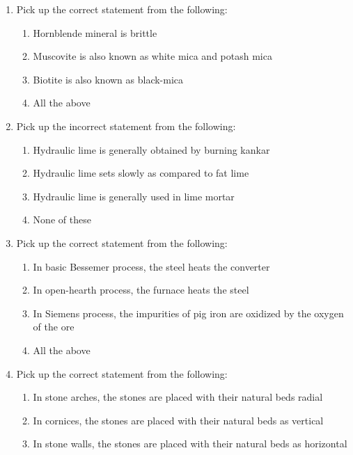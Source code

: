 \documentclass[11pt,a4paper]{article}
\begin{document}
\begin{enumerate}
\\
\item{Pick up the correct statement from the following:}
\begin{enumerate}[label=\Alph*.]
\item{Hornblende mineral is brittle}
\item{Muscovite is also known as white mica and potash mica}
\item{Biotite is also known as black-mica}
\item{All the above}
\end{enumerate}
\item{Pick up the incorrect statement from the following:}
\begin{enumerate}[label=\Alph*.]
\item{Hydraulic lime is generally obtained by burning kankar}
\item{Hydraulic lime sets slowly as compared to fat lime}
\item{Hydraulic lime is generally used in lime mortar}
\item{None of these}
\end{enumerate}
\item{Pick up the correct statement from the following:}
\begin{enumerate}[label=\Alph*.]
\item{In basic Bessemer process, the steel heats the converter}
\item{In open-hearth process, the furnace heats the steel}
\item{In Siemens process, the impurities of pig iron are oxidized by the oxygen of the ore}
\item{All the above}
\end{enumerate}
\item{Pick up the correct statement from the following:}
\begin{enumerate}[label=\Alph*.]
\item{In stone arches, the stones are placed with their natural beds radial}
\item{In cornices, the stones are placed with their natural beds as vertical}
\item{In stone walls, the stones are placed with their natural beds as horizontal}

\end{enumerate}
\end{enumerate}
\end{document}
